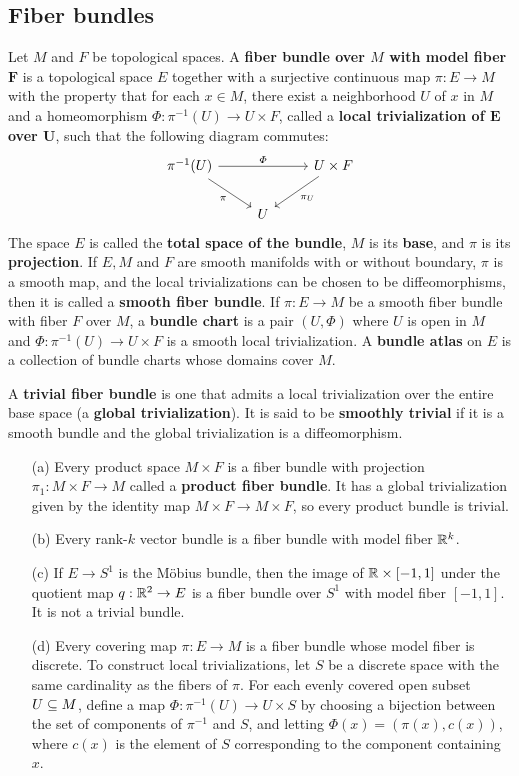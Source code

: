 \subsection{Fiber bundles}
Let $M$ and $F$ be topological spaces. A \textbf{fiber bundle over $M$ with model fiber $\bm{F}$} is a topological space $E$ together with a surjective continuous map $\pi:E\to M$ with the property that for each $x\in M$, there exist a neighborhood $U$ of $x$ in $M$ and a homeomorphism $\varPhi:\pi^{-1}(U)\to U\times F$, called a \textbf{local trivialization of $\bm{E}$ over $\bm{U}$}, such that the following diagram commutes:
\[\begin{tikzcd}
\pi^{-1}(U)\ar[rr,"\varPhi"]\ar[rd,swap,"\pi"]&&U\times F\ar[ld,"\pi_U"]\\
&U&
\end{tikzcd}\]
The space $E$ is called the \textbf{total space of the bundle}, $M$ is its \textbf{base}, and $\pi$ is its \textbf{projection}. If $E,M$ and $F$ are 
smooth manifolds with or without boundary, $\pi$ is a smooth map, and the local trivializations can be chosen to be diffeomorphisms, then it is called 
a \textbf{smooth fiber bundle}. If $\pi:E\to M$ be a smooth fiber bundle with fiber $F$ over $M$, a \textbf{bundle chart} is a pair $(U,\varPhi)$ where 
$U$ is open in $M$ and $\varPhi:\pi^{-1}(U)\to U\times F$ is a smooth local trivialization. A \textbf{bundle atlas} on $E$ is a collection of bundle 
charts whose domains cover $M$.\par
A \textbf{trivial fiber bundle} is one that admits a local trivialization over the entire base space (a \textbf{global trivialization}). It is said to be \textbf{smoothly trivial} if it is a smooth bundle and the global trivialization is a diffeomorphism.
\begin{example}\label{fiber bundle eg}
\mbox{}
\begin{itemize}
\item[(a)]Every product space $M\times F$ is a fiber bundle with projection $\pi_1:M\times F\to M$ called a \textbf{product fiber bundle}. It has a global trivialization given by the identity map $M\times F\to M\times F$, so every product bundle is trivial.
\item[(b)]Every rank-$k$ vector bundle is a fiber bundle with model fiber $\mathbb{R}^k$.
\item[(c)]If $E\to S^1$ is the M\"obius bundle, then the image of $\mathbb{R}\times[-1,1]$ under the quotient map $q:\mathbb{R}^2\to E$ is a fiber bundle over $S^1$ with model fiber $[-1,1]$. It is not a trivial bundle.
\item[(d)]Every covering map $\pi:E\to M$ is a fiber bundle whose model fiber is discrete. To construct local trivializations, let $S$ be a discrete space 
with the same cardinality as the fibers of $\pi$. For each evenly covered open subset $U\subseteq M$, define a map $\varPhi:\pi^{-1}(U)\to U\times S$ by choosing 
a bijection between the set of components of $\pi^{-1}$ and $S$, and letting $\varPhi(x)=(\pi(x),c(x))$, where $c(x)$ is the element of $S$ corresponding to 
the component containing $x$.
\end{itemize}
\end{example}

